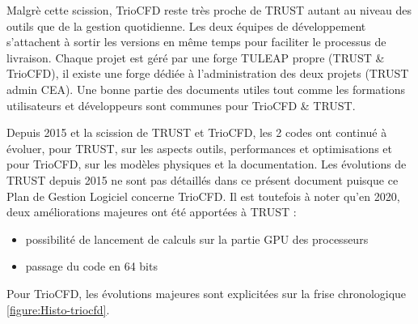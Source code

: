 Malgr\`e cette scission, TrioCFD reste tr\`es proche de TRUST autant au niveau
des outils que de la gestion quotidienne. Les deux équipes de développement s'attachent \`a sortir les versions en 
m\^eme temps pour faciliter le processus de livraison. Chaque projet est g\'er\'e par 
une forge TULEAP propre (TRUST \& TrioCFD), il existe une forge d\'edi\'ee \`a l'administration des deux projets (TRUST admin CEA). Une bonne partie des documents utiles tout comme les formations utilisateurs et d\'eveloppeurs sont communes pour TrioCFD \& TRUST.\smallskip\newline

Depuis 2015 et la scission de TRUST et TrioCFD, les 2 codes ont continu\'e \`a \'evoluer, pour TRUST, sur les aspects outils, performances et optimisations et pour TrioCFD, sur les mod\`eles physiques et la documentation. Les \'evolutions de TRUST depuis 2015 ne sont pas d\'etaill\'es dans ce pr\'esent document puisque ce Plan de Gestion Logiciel concerne TrioCFD. Il est toutefois \`a noter qu'en 2020, deux am\'eliorations majeures ont \'et\'e apportées à TRUST :
\begin{itemize}
	\item possibilit\'e de lancement de calculs sur la partie GPU des processeurs
	\item passage du code en 64 bits
\end{itemize}
\vspace{1cm}
Pour TrioCFD, les \'evolutions majeures sont explicit\'ees sur la frise chronologique
\ref{figure:Histo-triocfd}.\smallskip

